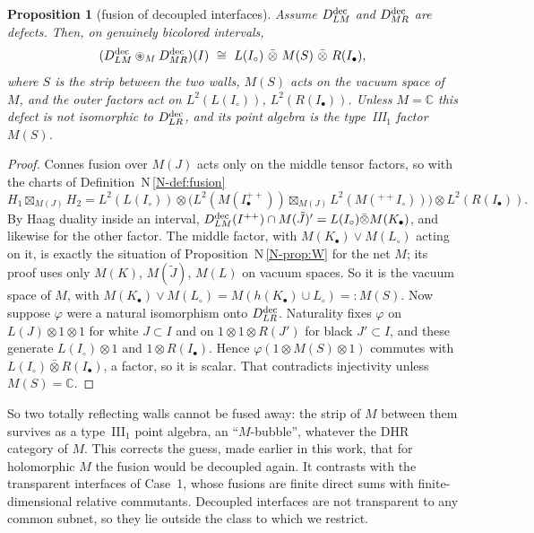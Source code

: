 \documentclass[11pt]{article}
\newtheorem{proposition}[theorem]{Proposition}
\theoremstyle{definition}
\theoremstyle{remark}
\newcommand{\fus}{\boxtimes}
\newcommand{\cfus}{\circledast}
\newcommand{\nref}[1]{N\,\ref{N-#1}}
\begin{document}
\begin{proposition}[fusion of decoupled interfaces]\label{prop:dec}
Assume $D^{\rm dec}_{LM}$ and $D^{\rm dec}_{MR}$ are defects. Then, on genuinely bicolored intervals,
\[
(D^{\rm dec}_{LM}\cfus_MD^{\rm dec}_{MR})(I)\ \cong\ L(I_\circ)\ \bar\otimes\ M(S)\ \bar\otimes\ R(I_\bullet),
\]
where $S$ is the strip between the two walls, $M(S)$ acts on the vacuum space of $M$, and the outer factors act on $L^2(L(I_\circ))$, $L^2(R(I_\bullet))$. Unless $M=\mathbb C$ this defect is not isomorphic to $D^{\rm dec}_{LR}$, and its point algebra is the type~III$_1$ factor $M(S)$.
\end{proposition}
\begin{proof}
Connes fusion over $M(J)$ acts only on the middle tensor factors, so with the charts of Definition~\nref{def:fusion}
\[
H_1\fus_{M(J)}H_2=L^2(L(I_\circ))\otimes\big(L^2(M(I^{++}_\bullet))\fus_{M(J)}L^2(M({}^{++}I_\circ))\big)\otimes L^2(R(I_\bullet)).
\]
By Haag duality inside an interval, $D^{\rm dec}_{LM}(I^{++})\cap M(\tilde J)'=L(I_\circ)\bar\otimes M(K_\bullet)$, and likewise for the other factor. The middle factor, with $M(K_\bullet)\vee M(L_\circ)$ acting on it, is exactly the situation of Proposition~\nref{prop:W} for the net $M$; its proof uses only $M(K)$, $M(\tilde J)$, $M(L)$ on vacuum spaces. So it is the vacuum space of $M$, with $M(K_\bullet)\vee M(L_\circ)=M(h(K_\bullet)\cup L_\circ)=:M(S)$. Now suppose $\varphi$ were a natural isomorphism onto $D^{\rm dec}_{LR}$. Naturality fixes $\varphi$ on $L(J)\otimes1\otimes1$ for white $J\subset I$ and on $1\otimes1\otimes R(J')$ for black $J'\subset I$, and these generate $L(I_\circ)\otimes1$ and $1\otimes R(I_\bullet)$. Hence $\varphi(1\otimes M(S)\otimes1)$ commutes with $L(I_\circ)\bar\otimes R(I_\bullet)$, a factor, so it is scalar. That contradicts injectivity unless $M(S)=\mathbb C$.
\end{proof}
So two totally reflecting walls cannot be fused away: the strip of $M$ between them survives as a type~III$_1$ point algebra, an ``$M$-bubble'', whatever the DHR category of $M$. This corrects the guess, made earlier in this work, that for holomorphic $M$ the fusion would be decoupled again. It contrasts with the transparent interfaces of Case~1, whose fusions are finite direct sums with finite-dimensional relative commutants. Decoupled interfaces are not transparent to any common subnet, so they lie outside the class to which we restrict.
\end{document}
